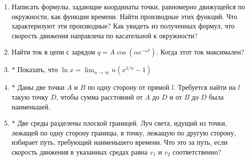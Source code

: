 \begin{enumerate}
    \item Написать формулы, задающие координаты точки, равномерно движущейся по окружности, как функции времени. Найти производные этих функций. Что характеризуют эти производные? Как увидеть из полученных формул, что скорость движения направлена по касательной к окружности?
    \item Найти ток в цепи с зарядом $q = A \cos (\alpha e^{-\omega t})$. Когда этот ток максимален?
    \item $\boldsymbol{*}$ Показать, что $\ln x = \lim_{n \rightarrow \infty} n (x^{1/n} - 1)$
    \item $\boldsymbol{*}$ Даны две точки $A$ и $B$ по одну сторону от прямой $l$. Требуется найти на $l$ такую точку $D$, чтобы сумма расстояний от $A$ до $D$ и от $B$ до $D$ была наименьшей.
    \item $\boldsymbol{*}$ Две среды разделены плоской границей. Луч света, идущий из точки, лежащей по одну сторону границы, в точку, лежащую по другую сторону, избирает путь, требующий наименьшего времени. Что это за путь, если скорость движения в указанных средах равна $v_1$ и $v_2$ соответственно?
\end{enumerate}